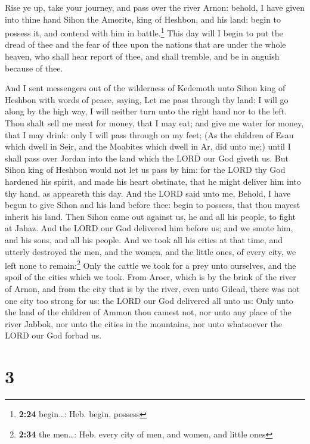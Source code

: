  Rise ye up, take your journey, and pass over the river
Arnon: behold, I have given into thine hand Sihon the Amorite, king of
Heshbon, and his land: begin to possess it, and contend with him in
battle.\footnote{\textbf{2:24} begin\ldots: Heb. begin, possess}
 This day will I begin to put the dread of thee and the
fear of thee upon the nations that are under the whole heaven, who shall
hear report of thee, and shall tremble, and be in anguish because of
thee.

 And I sent messengers out of the wilderness of Kedemoth
unto Sihon king of Heshbon with words of peace, saying, 
Let me pass through thy land: I will go along by the high way, I will
neither turn unto the right hand nor to the left.  Thou
shalt sell me meat for money, that I may eat; and give me water for
money, that I may drink: only I will pass through on my feet;
 (As the children of Esau which dwell in Seir, and the
Moabites which dwell in Ar, did unto me;) until I shall pass over Jordan
into the land which the LORD our God giveth us.  But
Sihon king of Heshbon would not let us pass by him: for the LORD thy God
hardened his spirit, and made his heart obstinate, that he might deliver
him into thy hand, as appeareth this day.  And the LORD
said unto me, Behold, I have begun to give Sihon and his land before
thee: begin to possess, that thou mayest inherit his land.
 Then Sihon came out against us, he and all his people,
to fight at Jahaz.  And the LORD our God delivered him
before us; and we smote him, and his sons, and all his people.
 And we took all his cities at that time, and utterly
destroyed the men, and the women, and the little ones, of every city, we
left none to remain:\footnote{\textbf{2:34} the men\ldots: Heb. every
  city of men, and women, and little ones}  Only the
cattle we took for a prey unto ourselves, and the spoil of the cities
which we took.  From Aroer, which is by the brink of the
river of Arnon, and from the city that is by the river, even unto
Gilead, there was not one city too strong for us: the LORD our God
delivered all unto us:  Only unto the land of the
children of Ammon thou camest not, nor unto any place of the river
Jabbok, nor unto the cities in the mountains, nor unto whatsoever the
LORD our God forbad us.

\hypertarget{section-2}{%
\section{3}\label{section-2}}

